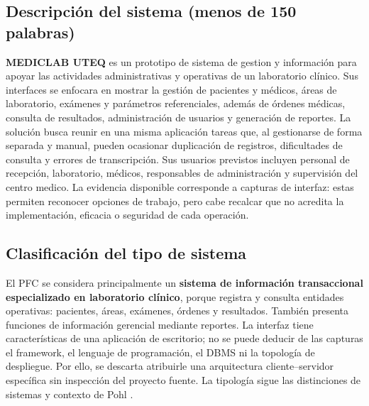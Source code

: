 \subsection{Descripción del sistema (menos de 150 palabras)}
\textbf{MEDICLAB UTEQ} es un prototipo de sistema de gestion y información para apoyar las actividades administrativas y operativas de un laboratorio clínico. Sus interfaces se enfocara en mostrar la gestión de pacientes y médicos, áreas de laboratorio, exámenes y parámetros referenciales, además de órdenes médicas, consulta de resultados, administración de usuarios y generación de reportes. La solución busca reunir en una misma aplicación tareas que, al gestionarse de forma separada y manual, pueden ocasionar duplicación de registros, dificultades de consulta y errores de transcripción. Sus usuarios previstos incluyen personal de recepción, laboratorio, médicos, responsables de administración y supervisión del centro medico. La evidencia disponible corresponde a capturas de interfaz: estas permiten reconocer opciones de trabajo, pero cabe recalcar que no acredita la implementación, eficacia o seguridad de cada operación.
\subsection{Clasificación del tipo de sistema}
El PFC se considera principalmente un \textbf{sistema de información transaccional especializado en laboratorio clínico}, porque registra y consulta entidades operativas: pacientes, áreas, exámenes, órdenes y resultados. También presenta funciones de información gerencial mediante reportes. La interfaz tiene características de una aplicación de escritorio; no se puede deducir de las capturas el framework, el lenguaje de programación, el DBMS ni la topología de despliegue. Por ello, se descarta atribuirle una arquitectura cliente--servidor específica sin inspección del proyecto fuente. La tipología sigue las distinciones de sistemas y contexto de Pohl \cite{pohl2025}.
